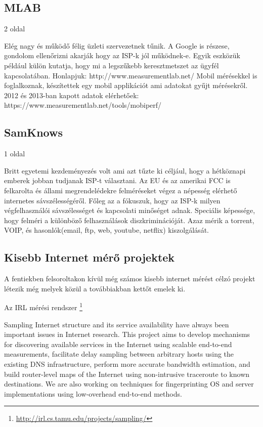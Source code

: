 \subsection{MLAB}
2 oldal

Elég nagy és működő félig üzleti szervezetnek tűnik. A Google is részese, gondolom ellenőrizni akarják hogy az ISP-k jól működnek-e. Egyik eszközük például külön kutatja, hogy mi a legszűkebb keresztmetszet az ügyfél kapcsolatában.
Honlapjuk: http://www.measurementlab.net/
Mobil mérésekkel is foglalkoznak, készítettek egy mobil applikációt ami adatokat gyűjt mérésekről. 2012 és 2013-ban kapott adatok elérhetőek: https://www.measurementlab.net/tools/mobiperf/

\subsection{SamKnows}
1 oldal

Britt egyetemi kezdeményezés volt ami azt tűzte ki céljául, hogy a hétköznapi emberek jobban tudjanak ISP-t választani. Az EU és az amerikai FCC is felkarolta és állami megrendelédekre felméréseket végez a népesség elérhető internetes sávszélességéről. Főleg az a fókuszuk, hogy az ISP-k milyen végfelhasználói sávszélességet és kapcsolati minőséget adnak. Speciális képessége, hogy felméri a különböző felhasználások diszkriminációját. Azaz mérik a torrent, VOIP, és hasonlók(email, ftp, web, youtube, netflix) kiszolgálását.


\subsection{Kisebb Internet mérő projektek}

A fentiekben felsoroltakon kívül még számos kisebb internet mérést célzó projekt létezik még melyek közül a továbbiakban kettőt emelek ki.

Az IRL mérési rendszer \footnote{\url{http://irl.cs.tamu.edu/projects/sampling/}}

Sampling Internet structure and its service availability have always been important issues in Internet research. This project aims to develop mechanisms for discovering available services in the Internet using scalable end-to-end measurements, facilitate delay sampling between arbitrary hosts using the existing DNS infrastructure, perform more accurate bandwidth estimation, and build router-level maps of the Internet using non-intrusive traceroute to known destinations. We are also working on techniques for fingerprinting OS and server implementations using low-overhead end-to-end methods.

